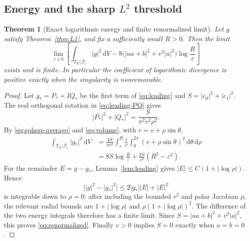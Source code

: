 \documentclass[11pt,a4paper]{article}
\numberwithin{equation}{section}
\newtheorem{theorem}{Theorem}[section]
\theoremstyle{definition}
\theoremstyle{remark}
\newcommand{\dd}{\,\mathrm d}
\begin{document}
\subsection{Energy and the sharp \texorpdfstring{$L^2$}{L2} threshold}
\begin{theorem}[Exact logarithmic energy and finite renormalized limit]
\label{thm:energy}
Let $g$ satisfy Theorem~\ref{thm:L1}, and fix a sufficiently small $R>0$.
Then the limit
\begin{equation}
 \lim_{\varepsilon\downarrow0}\left[
 \int_{T_R\setminus\overline{T_\varepsilon}}|g|^2\dd V
 -8\bigl(|ua+b|^2+v^2|a|^2\bigr)\log\frac R\varepsilon
 \right]
 \label{eq:renormalized}
\end{equation}
exists and is finite. In particular the coefficient of logarithmic divergence
is positive exactly when the singularity is nonremovable.
\end{theorem}
\begin{proof}
Let $g_*=P_*+I Q_*$ be the first term of \eqref{eq:leading} and
$S=|c_0|^2+|c_1|^2$. The real orthogonal rotation in
\eqref{eq:leading-PQ} gives
\[
 |P_*|^2+|Q_*|^2=\frac{S}{\pi^2v^2\rho^2}.
\]
By \eqref{eq:sphere-average} and \eqref{eq:volume}, with
$r=v+\rho\sin\theta$,
\begin{align*}
 \int_{T_R\setminus\overline{T_\varepsilon}}|g_*|^2\dd V
 &=\frac{4S}{\pi v^2}\int_\varepsilon^R\frac1\rho
     \int_0^{2\pi}(v+\rho\sin\theta)^2\dd\theta\dd\rho\\
 &=8S\log\frac R\varepsilon+
     \frac{2S}{v^2}(R^2-\varepsilon^2).
\end{align*}
For the remainder $E=g-g_*$, Lemma~\ref{lem:leading} gives
$|E|\le C(1+|\log\rho|)$. Hence
\[
 \bigl||g|^2-|g_*|^2\bigr|
 \le2|g_*||E|+|E|^2
\]
is integrable down to $\rho=0$: after including the bounded $r^2$ and polar
Jacobian $\rho$, the relevant radial bounds are
$1+|\log\rho|$ and $\rho(1+|\log\rho|)^2$.
The difference of the two energy integrals therefore has a finite limit.
Since $S=|ua+b|^2+v^2|a|^2$, this proves \eqref{eq:renormalized}.
Finally $v>0$ implies $S=0$ exactly when $a=b=0$.
\end{proof}
\end{document}
